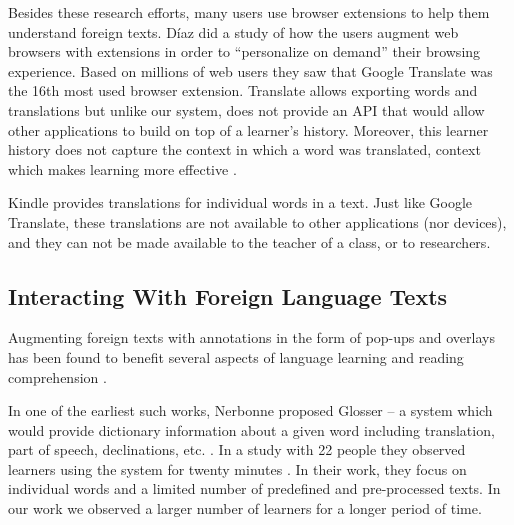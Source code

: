
Besides these research efforts, many users use browser extensions to help them understand foreign texts. D\'iaz \cite{Diaz15-Augmented} did a study of how the users augment web browsers with extensions in order to ``personalize on demand'' their browsing experience. Based on millions of web users they saw that Google Translate was the 16th most used browser extension. 
Translate allows exporting words and translations but unlike our system, does not provide an API that would allow other applications to build on top of a learner's history. Moreover, this learner history does not capture the context in which a word was translated, context which makes learning more effective \cite{nagy95-context}. 

Kindle provides translations for individual words in a text. Just like Google Translate, these translations are not available to other applications (nor devices), and they can not be made available to the teacher of a class, or to researchers. 


\subsection{Interacting With Foreign Language Texts}

Augmenting foreign texts with annotations in the form of pop-ups and overlays has been found to benefit several aspects of language learning \cite{DeRidder02-Links} and reading comprehension \cite{Sanko06-Effects}.



	In one of the earliest such works, Nerbonne proposed Glosser -- a system which would provide dictionary information about a given word including translation, part of speech, declinations, etc. \cite{Nerb99-Assistant}.
	In a study with 22 people they observed learners using the system for twenty minutes \cite{Dokter98-UserStudy}. 
	In their work, they focus on individual words and a limited number of predefined and pre-processed texts. 
	In our work we observed a larger number of learners for a longer period of time.


